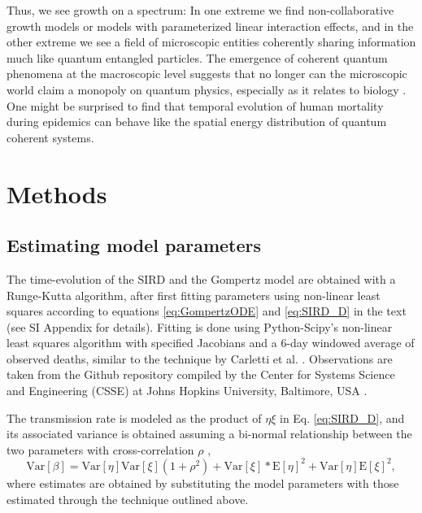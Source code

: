 \documentclass[review]{elsarticle}
\begin{document}
Thus, we see growth on a spectrum: In one extreme we find non-collaborative growth models or models with parameterized linear interaction effects, and in the other extreme we see a field of microscopic entities coherently sharing information much like quantum entangled particles. The emergence of coherent quantum phenomena at the macroscopic level suggests that no longer can the microscopic world claim a monopoly on quantum physics, especially as it relates to biology \citep{lambert2013quantum}. One might be surprised to find that temporal evolution of human mortality during epidemics can behave like the spatial energy distribution of quantum coherent systems.

\section{Methods}

\subsection{Estimating model parameters}
The time-evolution of the SIRD and the Gompertz model are obtained with a Runge-Kutta algorithm, after first fitting parameters using non-linear least squares according to equations \ref{eq:GompertzODE} and \ref{eq:SIRD_D} in the text (see SI Appendix for details). 
Fitting is done using Python-Scipy's non-linear least squares algorithm with specified Jacobians and a 6-day windowed average of observed deaths, similar to the technique by Carletti et al. \citep{carletti2020covid}. 
Observations are taken from the Github repository compiled by the Center for Systems Science and Engineering (CSSE) at Johns Hopkins University, Baltimore, USA \citep{dong2020interactive}. 


The transmission rate is modeled as the product of $\eta \xi$ in Eq. \ref{eq:SIRD_D}, and its associated variance is obtained assuming a bi-normal relationship between the two parameters with cross-correlation $\rho$ \citep{nadarajah2016distribution},
\begin{equation}
\text{Var}[\beta] = \text{Var}[\eta] \text{Var}[\xi] (1 + \rho^2) + \text{Var}[\xi]*\text{E}[\eta]^2 + \text{Var}[\eta] \text{E}[\xi]^2,
\end{equation}
where estimates are obtained by substituting the model parameters with those estimated through the technique outlined above.
\end{document}
